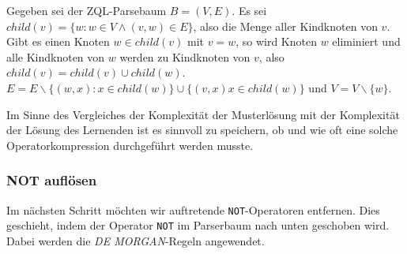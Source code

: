Gegeben sei der ZQL-Parsebaum $B=(V,E)$. Es sei $child(v) = \{ w : w\in V \wedge (v,w)\in E\}$, also die Menge aller Kindknoten von $v$. Gibt es einen Knoten $w\in child(v)$ mit $v=w$, so wird Knoten $w$ eliminiert und alle Kindknoten von $w$ werden zu Kindknoten von $v$, also $child(v) = child(v) \cup child(w)$. 
$E=E\backslash \{ (w,x) : x\in child(w)\} \cup \{(v,x) x\in child(w)\}$ und $V=V\backslash \{w\}$.

Im Sinne des Vergleiches der Komplexität der Musterlösung mit der Komplexität der Lösung des Lernenden ist es sinnvoll zu speichern, ob und wie oft eine solche Operatorkompression durchgeführt werden musste.

\subsubsection{NOT auflösen}

Im nächsten Schritt möchten wir auftretende \verb|NOT|-Operatoren entfernen. Dies geschieht, indem der Operator \verb|NOT| im Parserbaum nach unten geschoben wird. Dabei werden die \textit{DE MORGAN}-Regeln angewendet. 

